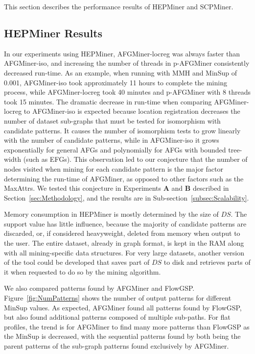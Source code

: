 This section describes the performance results of HEPMiner and SCPMiner.
\subsection{HEPMiner Results}
In our experiments using HEPMiner, AFGMiner-locreg was always faster than AFGMiner-iso, and increasing the number of threads in p-AFGMiner consistently decreased run-time. As an example, when running with MMH and MinSup of 0.001, AFGMiner-iso took approximately 11 hours to complete the mining process, while AFGMiner-locreg took 40 minutes and p-AFGMiner with 8 threads took 15 minutes. The dramatic decrease in run-time when comparing AFGMiner-locreg to AFGMiner-iso is expected because location registration decreases the number of dataset sub-graphs that must be tested for isomorphism with candidate patterns. It causes the number of isomorphism tests to grow linearly with the number of candidate patterns, while in AFGMiner-iso it grows exponentially for general AFGs and polynomially for AFGs with bounded tree-width (such as EFGs). This observation led to our conjecture that the number of nodes visited when mining for each candidate pattern is the major factor determining the run-time of AFGMiner, as opposed to other factors such as the MaxAttrs. We tested this conjecture in Experiments {\bf A} and {\bf B} described in Section~\ref{sec:Methodology}, and the results are in Sub-section~\ref{subsec:Scalability}.

Memory consumption in HEPMiner is mostly determined by the size of $DS$. The support value has little influence, because the majority of candidate patterns are discarded, or, if considered heavyweight, deleted from memory when output to the user. The entire dataset, already in graph format, is kept in the RAM along with all mining-specific data structures. For very large datasets, another version of the tool could be developed that saves part of $DS$ to disk and retrieves parts of it when requested to do so by the mining algorithm.

We also compared patterns found by AFGMiner and FlowGSP. Figure~\ref{fig:NumPatterns} shows the number of output patterns for different MinSup values. As expected, AFGMiner found all patterns found by FlowGSP, but also found additional patterns composed of multiple sub-paths. For flat profiles, the trend is for AFGMiner to find many more patterns than FlowGSP as the MinSup is decreased, with the sequential patterns found by both being the parent patterns of the sub-graph patterns found exclusively by AFGMiner. 

